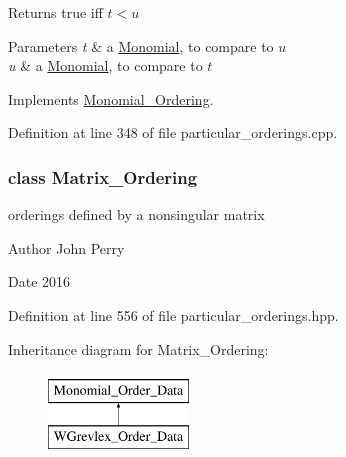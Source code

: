 \begin{DoxyReturn}{Returns}
{\ttfamily true} iff $t< u$ 
\end{DoxyReturn}

\begin{DoxyParams}{Parameters}
{\em t} & a \hyperlink{group__polygroup_class_monomial}{Monomial}, to compare to $ u $ \\
\hline
{\em u} & a \hyperlink{group__polygroup_class_monomial}{Monomial}, to compare to $ t $ \\
\hline
\end{DoxyParams}


Implements \hyperlink{group__orderinggroup_ab6c02638f87382f7a9a95b994e9a5dfb}{Monomial\+\_\+\+Ordering}.



Definition at line 348 of file particular\+\_\+orderings.\+cpp.

\label{class_matrix___ordering}
\subsubsection{class Matrix\+\_\+\+Ordering}
orderings defined by a nonsingular matrix 

\begin{DoxyAuthor}{Author}
John Perry 
\end{DoxyAuthor}
\begin{DoxyDate}{Date}
2016 
\end{DoxyDate}


Definition at line 556 of file particular\+\_\+orderings.\+hpp.

Inheritance diagram for Matrix\+\_\+\+Ordering\+:\begin{figure}[H]
\begin{center}
\leavevmode
\includegraphics[height=2.000000cm]{group__orderinggroup}
\end{center}
\end{figure}
